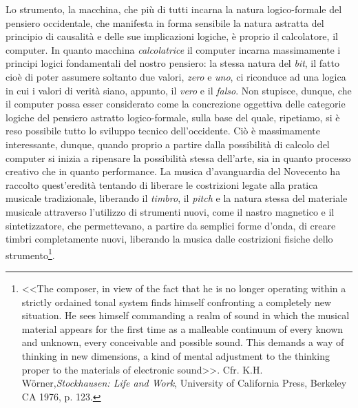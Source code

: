 \documentclass[a4paper,12pt]{scrartcl}
\begin{document}
	Lo strumento, la macchina, che più di tutti incarna la natura logico-formale del pensiero occidentale, che manifesta in forma sensibile la natura astratta del principio di causalità e delle sue implicazioni logiche, è proprio il calcolatore, il computer. In quanto macchina \emph{calcolatrice} il computer incarna massimamente i principi logici fondamentali del nostro pensiero: la stessa natura del \emph{bit}, il fatto cioè di poter assumere soltanto due valori, \emph{zero} e \emph{uno}, ci riconduce ad una logica in cui i valori di verità siano, appunto, il \emph{vero} e il \emph{falso}. Non stupisce, dunque, che il computer possa esser considerato come la concrezione oggettiva delle categorie logiche del pensiero astratto logico-formale, sulla base del quale, ripetiamo, si è reso possibile tutto lo sviluppo tecnico dell'occidente. Ciò è massimamente interessante, dunque, quando proprio a partire dalla possibilità di calcolo del computer si inizia a ripensare la possibilità stessa dell'arte, sia in quanto processo creativo che in quanto performance. La musica d'avanguardia del Novecento ha raccolto quest'eredità tentando di liberare le costrizioni legate alla pratica musicale tradizionale, liberando il \emph{timbro}, il \emph{pitch} e la natura stessa del materiale musicale attraverso l'utilizzo di strumenti nuovi, come il nastro magnetico e il sintetizzatore, che permettevano, a partire da semplici forme d'onda, di creare timbri completamente nuovi, liberando la musica dalle costrizioni fisiche dello strumento\footnote{<<The composer, in view of the fact that he is no longer operating within a strictly ordained tonal system finds himself confronting a completely new situation. He sees himself commanding a realm of sound in which the musical material appears for the first time as a malleable continuum of every known and unknown, every conceivable and possible sound. This demands a way of thinking in new dimensions, a kind of mental adjustment to the thinking proper to the materials of electronic sound>>. Cfr. K.H. W{\"o}rner,\textit{Stockhausen: Life and Work}, University of California Press, Berkeley CA 1976, p. 123.}.
\end{document}
